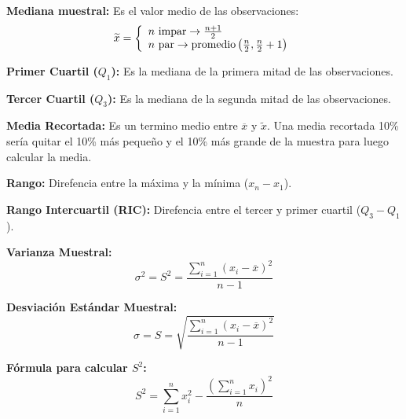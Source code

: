 \documentclass[12pt,a4paper]{report}
\begin{document}
	\vspace{3mm}
	\par \textbf{Mediana muestral:} Es el valor medio de las observaciones:
	\begin{equation*}
		\widetilde{x} =
	  	\left \lbrace
	  	\begin{array}{l}
			n \textup{ impar} \rightarrow \frac{n + 1}{2} \\	
	    	n \textup{ par} \rightarrow \textup{promedio} \left(\frac{n}{2}, \frac{n}{2} + 1 \right)	
  		\end{array}
  		\right.
	\end{equation*}
	
	\vspace{3mm}
	\par \textbf{Primer Cuartil ($Q_{1}$):} Es la mediana de la primera mitad de las observaciones.
	
	\vspace{3mm}
	\par \textbf{Tercer Cuartil ($Q_{3}$):} Es la mediana de la segunda mitad de las observaciones.
	
	\vspace{3mm}
	\par \textbf{Media Recortada:} Es un termino medio entre $\overline{x}$ y $\widetilde{x}$. Una media recortada 10\% sería quitar el 10\% más pequeño y el 10\% más grande de la muestra para luego calcular la media.
	
	\vspace{3mm}
	\par \textbf{Rango:} Direfencia entre la máxima y la mínima ($x_{n} - x_{1}$).
	
	\vspace{3mm}
	\par \textbf{Rango Intercuartil (RIC):} Direfencia entre el tercer y primer cuartil ($Q_{3} - Q_{1}$).
	
	\vspace{3mm}
	\par \textbf{Varianza Muestral:}
	\[
		\sigma^{2} = S^{2} = \frac{\sum_{i=1}^{n} {(x_{i} - \overline{x})}^{2}}{n - 1}
	\]
	
	\vspace{3mm}
	\par \textbf{Desviación Estándar Muestral:}
	\[
		\sigma = S = \sqrt{\frac{\sum_{i=1}^{n} {(x_{i} - \overline{x})}^{2}}{n - 1}}
	\]
	
	\vspace{3mm}
	\par \textbf{Fórmula para calcular $S^{2}$:}
	\[
		S^{2} = \sum_{i=1}^{n} x_{i}^{2} - \frac{{(\sum_{i=1}^{n} x_{i})}^{2}}{n}
	\]
	
\end{document}
